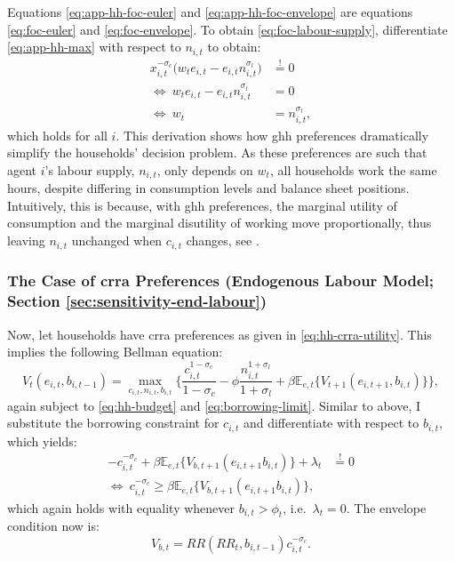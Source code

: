 \documentclass[a4paper,12pt]{article} %
\numberwithin{equation}{section} %
\numberwithin{figure}{section}
\numberwithin{table}{section}
\begin{document}
\begin{refsection}
\begin{appendices}
Equations \eqref{eq:app-hh-foc-euler} and \eqref{eq:app-hh-foc-envelope} are equations \eqref{eq:foc-euler} and \eqref{eq:foc-envelope}. To obtain \eqref{eq:foc-labour-supply}, differentiate \eqref{eq:app-hh-max} with respect to $n_{i,t}$ to obtain:
\begin{align}
    x_{i,t}^{-\sigma_c} \big( w_t e_{i,t} - e_{i,t} n_{i,t}^{\sigma_l} \big) &\overset{!}{=} 0 \nonumber \\
    \Leftrightarrow \ w_t e_{i,t} - e_{i,t} n_{i,t}^{\sigma_l} &= 0 \nonumber \\
    \Leftrightarrow \  w_t &= n_{i,t}^{\sigma_l}, \label{eq:app-hh-foc-labour}
\end{align}
which holds for all $i$. This derivation shows how \Gls{ghh} preferences dramatically simplify the households' decision problem. As these preferences are such that agent $i$'s labour supply, $n_{i,t}$, only depends on $w_t$, all households work the same hours, despite differing in consumption levels and balance sheet positions. Intuitively, this is because, with \Gls{ghh} preferences, the marginal utility of consumption and the marginal disutility of working move proportionally, thus leaving $n_{i,t}$ unchanged when $c_{i,t}$ changes, see \textcite{auclert2017}.

\subsubsection*{The Case of \Gls{crra} Preferences (Endogenous Labour Model; Section \ref{sec:sensitivity-end-labour})}

Now, let households have \Gls{crra} preferences as given in \eqref{eq:hh-crra-utility}. This implies the following Bellman equation:
\begin{equation}
    V_t (e_{i,t}, b_{i,t-1}) = \max_{c_{i,t}, n_{i,t}, b_{i,t}} \Bigg\{ \frac{c_{i,t}^{1-\sigma_c}}{1-\sigma_c} - \phi \frac{n_{i,t}^{1+\sigma_l}}{1+\sigma_l} + \beta \mathbb{E}_{e,t} \{ V_{t+1} (e_{i,t+1}, b_{i,t}) \} \Bigg\}, \label{eq:app-hh-bellman-crra}
\end{equation}
again subject to \eqref{eq:hh-budget} and \eqref{eq:borrowing-limit}. Similar to above, I substitute the borrowing constraint for $c_{i,t}$ and differentiate with respect to $b_{i,t}$, which yields:
\begin{align}
    -c_{i,t}^{-\sigma_c} + \beta \mathbb{E}_{e,t} \{ V_{b,t+1} (e_{i,t+1} b_{i,t} ) \} + \lambda_t &\overset{!}{=} 0 \nonumber \\
    \Leftrightarrow \ c_{i,t}^{-\sigma_c} \ge \beta \mathbb{E}_{e,t} \{ V_{b,t+1} (e_{i,t+1} b_{i,t} ) \}, \label{eq:app-hh-foc-euler-crra}
\end{align}
which again holds with equality whenever $b_{i,t} > \phi_t$, i.e.~$\lambda_t = 0$. The envelope condition now is:
\begin{equation}
    V_{b,t} = RR (RR_t, b_{i,t-1}) c_{i,t}^{-\sigma_c}. \label{eq:app-hh-foc-envelope-crra}
\end{equation}


\end{appendices}
\end{refsection}
\end{document}

